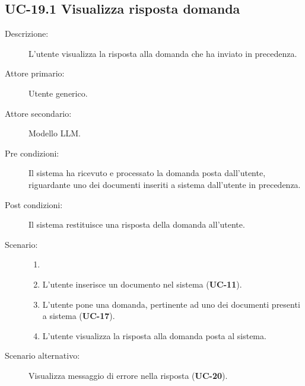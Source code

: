 \subsection{UC-19.1 Visualizza risposta domanda}
\begin{description}
    \item[Descrizione:] L'utente visualizza la risposta alla domanda che ha inviato in precedenza.
    \item[Attore primario:] Utente generico.
    \item[Attore secondario:] Modello LLM. 
    \item[Pre condizioni:] Il sistema ha ricevuto e processato la domanda posta dall'utente, riguardante uno dei documenti inseriti a sistema dall'utente in precedenza.
    \item[Post condizioni:] Il sistema restituisce una risposta della domanda all'utente.
    \item[Scenario:]
    \begin{enumerate}
        \item[]
        \item L’utente inserisce un documento nel sistema (\textbf{UC-11}).
        \item L’utente pone una domanda, pertinente ad uno dei documenti presenti a sistema (\textbf{UC-17}).
        \item L'utente visualizza la risposta alla domanda posta al sistema.
    \end{enumerate}
    \item[Scenario alternativo:] Visualizza messaggio di errore nella risposta (\textbf{UC-20}).
\end{description}

